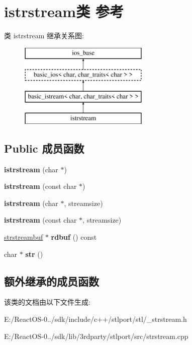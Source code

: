 \hypertarget{classistrstream}{}\section{istrstream类 参考}
\label{classistrstream}
类 istrstream 继承关系图\+:\begin{figure}[H]
\begin{center}
\leavevmode
\includegraphics[height=4.000000cm]{classistrstream}
\end{center}
\end{figure}
\subsection*{Public 成员函数}
\begin{DoxyCompactItemize}
\item 
\mbox{\label{classistrstream_a11a747beadf12cb13579aa7ce441ef94}} 
{\bfseries istrstream} (char $\ast$)
\item 
\mbox{\label{classistrstream_a0db57fbe41af30f9f491ec49cfe5f790}} 
{\bfseries istrstream} (const char $\ast$)
\item 
\mbox{\label{classistrstream_ac8b1a56928a864d1fb1d8d2de34d3731}} 
{\bfseries istrstream} (char $\ast$, streamsize)
\item 
\mbox{\label{classistrstream_a49b66afc0fdd063c34301332b51cc06f}} 
{\bfseries istrstream} (const char $\ast$, streamsize)
\item 
\mbox{\label{classistrstream_abb129bcbcfb6cc15caefa6220249cbf3}} 
\hyperlink{classstrstreambuf}{strstreambuf} $\ast$ {\bfseries rdbuf} () const
\item 
\mbox{\label{classistrstream_a44434c990098f00942761555408c120c}} 
char $\ast$ {\bfseries str} ()
\end{DoxyCompactItemize}
\subsection*{额外继承的成员函数}


该类的文档由以下文件生成\+:\begin{DoxyCompactItemize}
\item 
E\+:/\+React\+O\+S-\/0../sdk/include/c++/stlport/stl/\+\_\+strstream.\+h\item 
E\+:/\+React\+O\+S-\/0../sdk/lib/3rdparty/stlport/src/strstream.\+cpp\end{DoxyCompactItemize}
